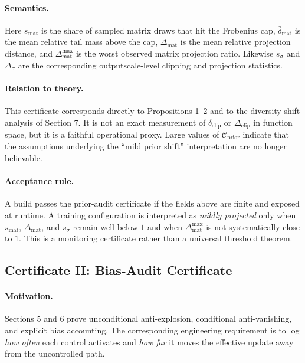 \documentclass[11pt]{article}
\newcommand{\1}{\mathbf{1}}
\begin{document}
\paragraph{Semantics.}
Here $s_{\mathrm{mat}}$ is the share of sampled matrix draws that hit the Frobenius cap, $\bar{\delta}_{\mathrm{mat}}$ is the mean relative tail mass above the cap, $\bar{\Delta}_{\mathrm{mat}}$ is the mean relative projection distance, and $\Delta^{\max}_{\mathrm{mat}}$ is the worst observed matrix projection ratio. Likewise $s_{\sigma}$ and $\bar{\Delta}_{\sigma}$ are the corresponding outputscale-level clipping and projection statistics.

\paragraph{Relation to theory.}
This certificate corresponds directly to Propositions 1--2 and to the diversity-shift analysis of Section 7. It is not an exact measurement of $\delta_{\mathrm{clip}}$ or $\Delta_{\mathrm{clip}}$ in function space, but it is a faithful operational proxy. Large values of $\mathcal{C}_{\mathrm{prior}}$ indicate that the assumptions underlying the ``mild prior shift'' interpretation are no longer believable.

\paragraph{Acceptance rule.}
A build passes the prior-audit certificate if the fields above are finite and exposed at runtime. A training configuration is interpreted as \emph{mildly projected} only when $s_{\mathrm{mat}}$, $\bar{\Delta}_{\mathrm{mat}}$, and $s_{\sigma}$ remain well below $1$ and when $\Delta^{\max}_{\mathrm{mat}}$ is not systematically close to $1$. This is a monitoring certificate rather than a universal threshold theorem.

\subsection{Certificate II: Bias-Audit Certificate}
\paragraph{Motivation.}
Sections 5 and 6 prove unconditional anti-explosion, conditional anti-vanishing, and explicit bias accounting. The corresponding engineering requirement is to log \emph{how often} each control activates and \emph{how far} it moves the effective update away from the uncontrolled path.
\end{document}
